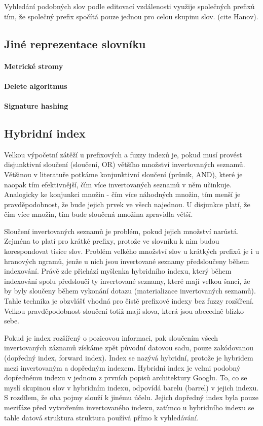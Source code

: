 \documentclass[12pt,letterpaper,oneside,openright]{book}
\begin{document}
Vyhledání podobných slov podle editovací vzdálenosti využije společných prefixů
tím, že společný prefix spočítá pouze jednou pro celou skupinu slov. (cite
Hanov).

\subsection{Jiné reprezentace slovníku}
\paragraph{Metrické stromy}
\paragraph{Delete algoritmus}
\paragraph{Signature hashing}

\subsection{Hybridní index}
Velkou výpočetní zátěží u prefixových a fuzzy indexů je, pokud musí provést
disjunktivní sloučení (sloučení, OR) většího množství invertovaných seznamů.
Většinou v literatuře potkáme konjunktivní sloučení (průnik, AND), které je
naopak tím efektivnější, čím více invertovaných seznamů v něm učinkuje.
Analogicky ke konjunkci množin - čím více náhodných množin, tím menší je
pravděpodobnost, že bude jejich prvek ve všech najednou. U disjunkce platí, že
čím více množin, tím bude sloučená množina zpravidla větší.

Sloučení invertovaných seznamů je problém, pokud jejich množství narůstá.
Zejména to platí pro krátké prefixy, protože ve slovníku k nim budou
korespondovat tisíce slov. Problém velkého množství slov u krátkých prefixů je
i u hranových ngramů, jenže u nich jsou invertované seznamy předsloučeny během
indexování. Právě zde přichází myšlenka hybridního indexu, který během
indexování spolu předsloučí ty invertované seznamy, které mají velkou šanci, že
by byly sloučeny během vykonání dotazu (materializace invertovaných seznamů).
Tahle technika je obzvlášť vhodná pro čistě prefixové indexy bez fuzzy
rozšíření. Velkou pravděpodobnost sloučení totiž mají slova, která jsou
abecedně blízko sebe.

Pokud je index rozšířený o pozicovou informaci, pak sloučením všech
invertovaných záznamů získáme zpět původní datovou sadu, pouze zakódovanou
(dopředný index, forward index). Index se nazývá hybridní, protože je hybridem
mezi invertovaným a dopředným indexem.  Hybridní index je velmi podobný
dopřednému indexu v jednom z prvních popisů architektury Googlu. To, co se
myslí skupinou slov v hybridním indexu, odpovídá barelu (barrel) v jejich
indexu. S rozdílem, že oba pojmy slouží k jinému účelu. Jejich dopředný index
byla pouze mezifáze před vytvořením invertovaného indexu, zatímco u hybridního
indexu se tahle datová struktura struktura používá přímo k vyhledávání.
\end{document}
